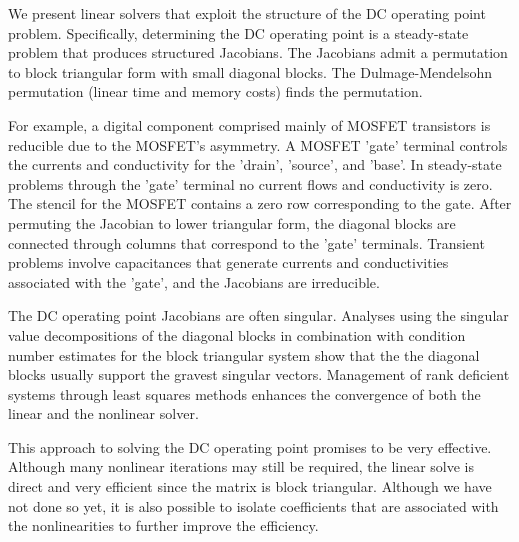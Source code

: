 \documentclass[10pt,fleqn]{article}
\begin{document}
We present linear solvers
that exploit the structure of the DC operating point problem.  Specifically,
determining the DC operating point is a steady-state problem that
produces structured Jacobians.  The Jacobians admit a permutation to
block triangular form with small diagonal blocks.  The Dulmage-Mendelsohn
permutation (linear time and memory costs) finds the permutation.

For example, a digital component comprised mainly of MOSFET transistors
is reducible due to the MOSFET's asymmetry.  A MOSFET 'gate' terminal
controls the currents and conductivity for the 'drain', 'source', 
and 'base'.  In steady-state problems through the 'gate' terminal
no current flows and conductivity is zero.  The stencil for the MOSFET
contains a zero row corresponding to the gate.  After permuting the
Jacobian  to lower triangular form, the diagonal blocks are connected
through columns that correspond to the 'gate' terminals.  Transient
problems involve capacitances that generate currents and conductivities
associated with the 'gate', and the Jacobians are irreducible.

The DC operating point Jacobians are often singular.  Analyses using
the singular value decompositions of the diagonal blocks in combination
with condition number estimates for the block triangular system show
that the the diagonal blocks usually support the gravest singular vectors.
Management of rank deficient systems through least squares methods
enhances the convergence of both the linear and the nonlinear solver.

This approach to solving the DC operating point promises to be very 
effective.  Although many nonlinear iterations may still be required,
the linear solve is direct and very efficient since the matrix is
block triangular.  Although we have not done so yet, it is also
possible to isolate coefficients that are associated with
the nonlinearities to further improve the efficiency.


\nopagebreak
\scriptsize

\end{document}
